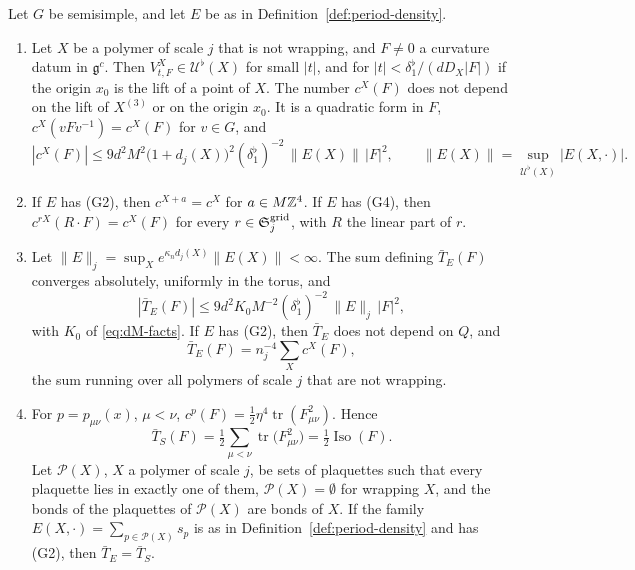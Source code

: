 \begin{lemma}\label{lem:period-density}
Let $G$ be semisimple, and let $E$ be as in Definition~\ref{def:period-density}.
\begin{enumerate}[label=(\alph*)]
\item Let $X$ be a polymer of scale $j$ that is not wrapping, and $F\ne0$ a curvature datum in $\mathfrak g^c$. Then $V^X_{t,F}\in\mathcal U^\flat(X)$ for small $|t|$, and for $|t|<\delta_1^\flat/(dD_X|F|)$ if the origin $x_0$ is the lift of a point of $X$. The number $c^X(F)$ does not depend on the lift of $X^{(3)}$ or on the origin $x_0$. It is a quadratic form in $F$, $c^X(vFv^{-1})=c^X(F)$ for $v\in G$, and
\[
|c^X(F)|\le9d^2M^2\big(1+d_j(X)\big)^2(\delta_1^\flat)^{-2}\,\|E(X)\|\,|F|^2,\qquad\|E(X)\|=\sup_{\mathcal U^\flat(X)}|E(X,\cdot)|.
\]
\item If $E$ has (G2), then $c^{X+a}=c^X$ for $a\in M\mathbb Z^4$. If $E$ has (G4), then $c^{rX}(R\cdot F)=c^X(F)$ for every $r\in\mathfrak S^{\rm grid}_j$, with $R$ the linear part of $r$.
\item Let $\|E\|_j=\sup_Xe^{\kappa_nd_j(X)}\|E(X)\|<\infty$. The sum defining $\bar T_E(F)$ converges absolutely, uniformly in the torus, and
\[
|\bar T_E(F)|\le9d^2K_0M^{-2}(\delta_1^\flat)^{-2}\,\|E\|_j\,|F|^2 ,
\]
with $K_0$ of \eqref{eq:dM-facts}. If $E$ has (G2), then $\bar T_E$ does not depend on $Q$, and
\[
\bar T_E(F)=n_j^{-4}\sum_Xc^X(F),
\]
the sum running over all polymers of scale $j$ that are not wrapping.
\item For $p=p_{\mu\nu}(x)$, $\mu<\nu$, $c^p(F)=\frac12\eta^4\operatorname{tr}(F_{\mu\nu}^2)$. Hence
\[
\bar T_S(F)=\tfrac12\sum_{\mu<\nu}\operatorname{tr}\big(F_{\mu\nu}^2\big)=\tfrac12\operatorname{Iso}(F).
\]
Let $\mathcal P(X)$, $X$ a polymer of scale $j$, be sets of plaquettes such that every plaquette lies in exactly one of them, $\mathcal P(X)=\emptyset$ for wrapping $X$, and the bonds of the plaquettes of $\mathcal P(X)$ are bonds of $X$. If the family $E(X,\cdot)=\sum_{p\in\mathcal P(X)}s_p$ is as in Definition~\ref{def:period-density} and has (G2), then $\bar T_E=\bar T_S$.
\end{enumerate}
\end{lemma}

